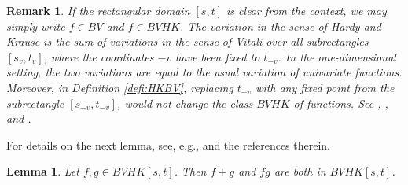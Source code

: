 \documentclass[english, a4paper, 12pt,reqno]{amsart}
\newtheorem{lemma}[defi]{Lemma}
\newtheorem{rem}[defi]{Remark}
\begin{document}
\begin{rem}
\label{rem:variations}
If the rectangular domain $[s,t]$ is clear from the context, we may simply write $f\in BV$ and $f\in BVHK$. The variation in the sense of Hardy and Krause is the sum of variations in the sense of Vitali over all subrectangles $[s_v,t_v]$, where the coordinates $-v$ have been fixed to $t_{-v}$. In the one-dimensional setting, the two variations are equal to the usual variation of univariate functions. 
Moreover, in Definition \ref{defi:HKBV}, replacing $t_{-v}$ with any fixed point from the subrectangle $[s_{-v}, t_{-v}]$, would not change the class $BVHK$ of functions. See \cite{owen2005multidimensional}, \cite{sard1963linear}, and \cite{youngfourier}.
\end{rem}

For details on the next lemma, see, e.g., \cite{owen2005multidimensional} and the  references therein.
\begin{lemma}
\label{lemma:bvkhproduct}
Let $f,g \in BVHK[s,t]$. Then $f+g$ and $fg$ are both in $BVHK[s,t]$.
\end{lemma}
\end{document}
